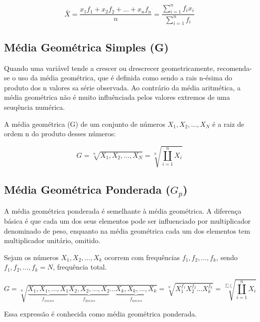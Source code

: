 \begin{equation}\label{media}
     \bar{X}= \frac{x_{1}f_{1}+x_{2}f_{2}+\ldots+x_{n}f_{n}}{n} = \frac{\sum_{i=1}^{n}f_{i}x_{i}}{\sum_{i=1}^{n}f_{i}}
\end{equation}





\subsection{Média Geométrica Simples (G)}

Quando uma variável tende a crescer ou drescrecer geometricamente, recomenda-se o uso da média geométrica, que é definida como sendo a rais n-ésima do produto dos n valores sa série observada. Ao contrário da média aritmética, a média geométrica não é muito influênciada pelos valores extremos de uma seuqência numérica.\vskip0.3cm


A média geométrica (G) de um conjunto de números $X_{1},X_{2},\ldots,X_{N}$ é a raiz de ordem n do produto
desses números:

\begin{equation}\label{Geometrica}
    G=\sqrt[n]{X_{1},X_{2},\ldots,X_{N}}=\sqrt[n]{\coprod_{i=1}^{n}X_{i}}
\end{equation}


\subsection{Média Geométrica Ponderada ($G_{p}$)}

A média geométrica ponderada é semelhante à média geométrica. A diferença básica é que cada um dos seus elementos pode ser influenciado por multiplicador denominado de peso, enquanto na média geométrica cada um dos elementos tem multiplicador unitário, omitido.\vskip0.3cm


Sejam os números $X_{1},X_{2},\ldots,X_{k}$ ocorrem com frequências $f_{1},f_{2},\ldots,f_{k}$, sendo $f_{1},f_{2},\ldots,f_{k}=N$, frequência total.


\begin{equation}\label{Geometrica}
    G=\sqrt[n]{\underbrace{X_{1},X_{1},...,X_{1}}_{f_{1vezes}}\underbrace{X_{2},X_{2},...,X_{2}}_{f_{2vezes}} \ldots \underbrace{X_{k},X_{k},...,X_{k}}_{f_{kvezes}}}=\sqrt[n]{X_{1}^{f_{1}}X_{2}^{f_{2}}\ldots X_{k}^{f_{k}}}
 = \sqrt[\sum f_{i}]{\coprod_{i=1}^{n}X_{i}}
\end{equation}

Essa expressão é conhecida como média geométrica ponderada.



